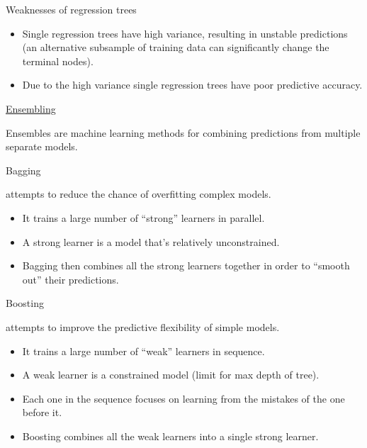 \documentclass[
  10pt,
  ignorenonframetext,
]{beamer}
\providecommand{\tightlist}{%
  \setlength{\itemsep}{0pt}\setlength{\parskip}{0pt}}
\begin{document}
\begin{frame}{Weaknesses of regression trees}
\protect\hypertarget{weaknesses-of-regression-trees}{}

\begin{itemize}
\tightlist
\item
  Single regression trees have high variance, resulting in unstable
  predictions (an alternative subsample of training data can
  significantly change the terminal nodes).
\item
  Due to the high variance single regression trees have poor predictive
  accuracy.
\end{itemize}

\end{frame}

\begin{frame}{\href{https://elitedatascience.com/overfitting-in-machine-learning}{Ensembling}}
\protect\hypertarget{ensembling}{}

Ensembles are machine learning methods for combining predictions from
multiple separate models.

\begin{block}{Bagging}

attempts to reduce the chance of overfitting complex models.

\begin{itemize}
\tightlist
\item
  It trains a large number of ``strong'' learners in parallel.
\item
  A strong learner is a model that's relatively unconstrained.
\item
  Bagging then combines all the strong learners together in order to
  ``smooth out'' their predictions.
\end{itemize}

\end{block}

\begin{block}{Boosting}

attempts to improve the predictive flexibility of simple models.

\begin{itemize}
\tightlist
\item
  It trains a large number of ``weak'' learners in sequence.
\item
  A weak learner is a constrained model (limit for max depth of tree).
\item
  Each one in the sequence focuses on learning from the mistakes of the
  one before it.
\item
  Boosting combines all the weak learners into a single strong learner.
\end{itemize}

\end{block}

\end{frame}
\end{document}
